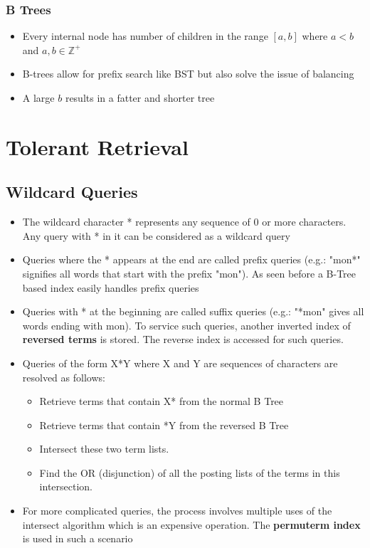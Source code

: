 \documentclass{article}
\begin{document}
\subsubsection{B Trees}
\begin{itemize}
    \item Every internal node has number of children in the range $[a, b]$ where $a<b$ and $a, b \in \mathbb{Z}^+$
    
    \item B-trees allow for prefix search like BST but also solve the issue of balancing
    
    \item A large $b$ results in a fatter and shorter tree
\end{itemize}

\section{Tolerant Retrieval}
\subsection{Wildcard Queries}
\begin{itemize}
    \item The wildcard character * represents any sequence of 0 or more characters. Any query with * in it can be considered as a wildcard query
    
    \item Queries where the * appears at the end are called prefix queries (e.g.: "mon*" signifies all words that start with the prefix "mon"). As seen before a B-Tree based index easily handles prefix queries
    
    \item Queries with * at the beginning are called suffix queries (e.g.: "*mon" gives all words ending with mon). To service such queries, another inverted index of \textbf{reversed terms} is stored. The reverse index is accessed for such queries.
    
    \item Queries of the form X*Y where X and Y are sequences of characters are resolved as follows:
    \begin{itemize}
        \item Retrieve terms that contain X* from the normal B Tree
        
        \item Retrieve terms that contain *Y from the reversed B Tree
        
        \item Intersect these two term lists. 
        
        \item Find the OR (disjunction) of all the posting lists of the terms in this intersection. 
    \end{itemize}
    
    \item For more complicated queries, the process involves multiple uses of the intersect algorithm which is an expensive operation. The \textbf{permuterm index} is used in such a scenario
\end{itemize}
\end{document}
